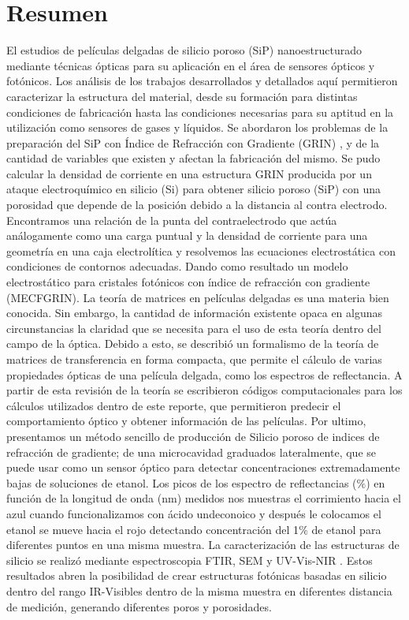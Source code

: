 \documentclass[a4paper,11pt,]{book}
\begin{document}
\chapter*{Resumen}
El estudios de películas delgadas de silicio poroso (SiP) nanoestructurado mediante técnicas ópticas para su aplicación en el área de sensores ópticos y fotónicos. Los análisis de los trabajos desarrollados y detallados aquí permitieron caracterizar la estructura del material, desde su formación para distintas condiciones de fabricación hasta las condiciones necesarias para su aptitud en la utilización como sensores de gases y líquidos. Se abordaron los problemas de la preparación del SiP con Índice de Refracción con Gradiente (GRIN) , y de la cantidad de variables que existen y afectan
la fabricación del mismo. Se pudo calcular la densidad de corriente en una estructura GRIN producida por un ataque electroquímico en silicio (Si)  para obtener  silicio poroso (SiP) con una porosidad que depende de la posición debido a la distancia al contra electrodo. Encontramos una relación de la punta del contraelectrodo que actúa an\'alogamente como una carga puntual y la densidad de corriente para una geometr\'ia en una caja electrolítica y resolvemos las ecuaciones electrostática con condiciones de contornos adecuadas. Dando como resultado un modelo electrostático para cristales fotónicos con \'indice de refracción con gradiente (MECFGRIN). La teoría de matrices en películas delgadas es una materia bien conocida. Sin embargo, la cantidad de información existente opaca en algunas circunstancias la claridad que se necesita para el uso de esta teoría
dentro del campo de la óptica. Debido a esto, se describió un formalismo de la teoría de matrices de transferencia en forma compacta, que permite el cálculo de varias propiedades ópticas de una película delgada, como los espectros de reflectancia. A partir de esta revisión de la teoría se
escribieron códigos computacionales para los cálculos utilizados dentro de este reporte, que permitieron predecir el comportamiento óptico y obtener información de las películas. Por ultimo, presentamos un método sencillo de producción de Silicio poroso de indices de refracción de gradiente; de una microcavidad  graduados lateralmente, que se  puede usar como un sensor óptico para detectar concentraciones extremadamente bajas de soluciones de etanol. Los picos de los espectro de reflectancias ($\%$) en función de la longitud de onda (nm) medidos nos muestras el corrimiento hacia el azul cuando funcionalizamos con ácido undeconoico y después le colocamos el etanol se mueve hacia el rojo detectando concentración del 1$\%$ de etanol para diferentes puntos en una misma muestra. La caracterización de las estructuras de silicio se realizó mediante espectroscopia FTIR, SEM  y UV-Vis-NIR . Estos resultados abren la posibilidad de crear estructuras fotónicas basadas en silicio dentro del rango IR-Visibles dentro de la misma muestra en diferentes distancia de medición, generando diferentes poros y porosidades.
\end{document}

